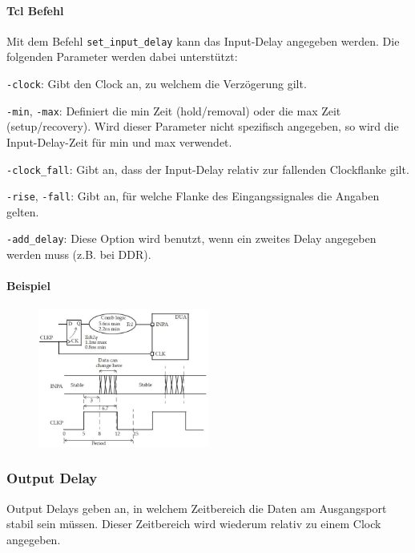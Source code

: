 \paragraph{Tcl Befehl}
Mit dem Befehl \texttt{set\_input\_delay} kann das Input-Delay angegeben werden. Die folgenden Parameter werden dabei unterstützt:
\begin{compactitem}
    \item \texttt{-clock}: Gibt den Clock an, zu welchem die Verzögerung gilt.
    \item \texttt{-min}, \texttt{-max}: Definiert die min Zeit (hold/removal) oder die max Zeit (setup/recovery). Wird dieser Parameter nicht spezifisch angegeben, so wird die Input-Delay-Zeit für min und max verwendet.
    \item \texttt{-clock\_fall}: Gibt an, dass der Input-Delay relativ zur fallenden Clockflanke gilt.
    \item \texttt{-rise}, \texttt{-fall}: Gibt an, für welche Flanke des Eingangssignales die Angaben gelten.
    \item \texttt{-add\_delay}: Diese Option wird benutzt, wenn ein zweites Delay angegeben werden muss (z.B. bei DDR).
\end{compactitem}

\paragraph{Beispiel}
\begin{figure}[H]
    \includegraphics[width=0.5\textwidth]{images/input_delay.png}
\end{figure}


\subsubsection{Output Delay} \label{chapter:output_delay}
Output Delays geben an, in welchem Zeitbereich die Daten am Ausgangsport stabil sein müssen. Dieser Zeitbereich wird wiederum relativ zu einem Clock angegeben.

